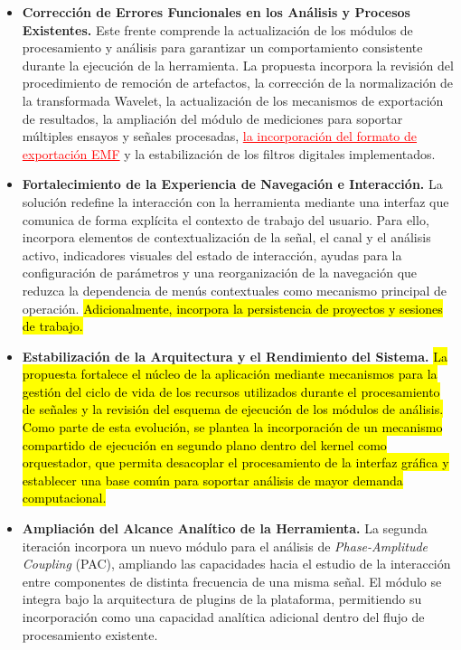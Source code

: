 \documentclass[12pt,letterpaper,oneside]{article}
\begin{document}
\begin{itemize}
  \item \textbf{Corrección de Errores Funcionales en los Análisis y Procesos Existentes.} Este frente comprende la actualización de los módulos de procesamiento y análisis para garantizar un comportamiento consistente durante la ejecución de la herramienta. La propuesta incorpora la revisión del procedimiento de remoción de artefactos, la corrección de la normalización de la transformada Wavelet, la actualización de los mecanismos de exportación de resultados, la ampliación del módulo de mediciones para soportar múltiples ensayos y señales procesadas, \textcolor{red}{\uline{la incorporación del formato de exportación EMF}} y la estabilización de los filtros digitales implementados.

  \item \textbf{Fortalecimiento de la Experiencia de Navegación e Interacción.} La solución redefine la interacción con la herramienta mediante una interfaz que comunica de forma explícita el contexto de trabajo del usuario. Para ello, incorpora elementos de contextualización de la señal, el canal y el análisis activo, indicadores visuales del estado de interacción, ayudas para la configuración de parámetros y una reorganización de la navegación que reduzca la dependencia de menús contextuales como mecanismo principal de operación. \hl{Adicionalmente, incorpora la persistencia de proyectos y sesiones de trabajo.}

  \item \textbf{Estabilización de la Arquitectura y el Rendimiento del Sistema.} \hl{La propuesta fortalece el núcleo de la aplicación mediante mecanismos para la gestión del ciclo de vida de los recursos utilizados durante el procesamiento de señales y la revisión del esquema de ejecución de los módulos de análisis. Como parte de esta evolución, se plantea la incorporación de un mecanismo compartido de ejecución en segundo plano dentro del kernel como orquestador, que permita desacoplar el procesamiento de la interfaz gráfica y establecer una base común para soportar análisis de mayor demanda computacional.}

  \item \textbf{Ampliación del Alcance Analítico de la Herramienta.} La segunda iteración incorpora un nuevo módulo para el análisis de \textit{Phase-Amplitude Coupling} (PAC), ampliando las capacidades hacia el estudio de la interacción entre componentes de distinta frecuencia de una misma señal. El módulo se integra bajo la arquitectura de plugins de la plataforma, permitiendo su incorporación como una capacidad analítica adicional dentro del flujo de procesamiento existente.
\end{itemize}
\end{document}

